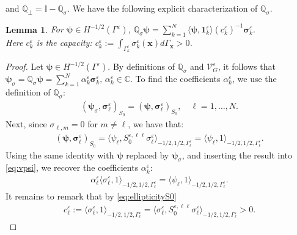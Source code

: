 \documentclass[]{article}
\newtheorem{lemma}{Lemma}
\numberwithin{equation}{section}
\numberwithin{theorem}{section}
\numberwithin{lemma}{section}
\numberwithin{corollary}{section}
\numberwithin{proposition}{section}
\numberwithin{definition}{section}
\newcommand{\re}{\varepsilon}
\renewcommand{\vec}{\boldsymbol}
\begin{document}
	and $\mathbb{Q}_{\perp}=\mathbb{I}-\mathbb{Q}_{\sigma}$. We have the following explicit characterization of $\mathbb{Q}_{\sigma}$. 
	\begin{lemma}
		\label{lem:expl_char}
		For $\vec{\psi}\in H^{-1/2}(\Gamma^{\re})$, $
		\mathbb{Q}_{\sigma}\vec{\psi}=\sum\limits_{k=1}^N \langle \vec{\psi},\vec{1}_k^{\re}\rangle \left(c_{k}^{\re}\right)^{-1} \vec{\sigma}_k^{\re}.$\\ Here $c^{\re}_k$ is the capacity: $c^{\re}_k:=\int_{\Gamma_k^{\re}}\sigma_{k}^{\re}(\vec{x})d\Gamma_{\vec{x}}>0$.
	\end{lemma}
	\begin{proof}
		Let $\vec{\psi}\in H^{-1/2}(\Gamma^{\re})$. By definitions of $\mathbb{Q}_{\sigma}$ and $\mathcal{V}^{\re}_G$, it follows that $
		\vec{\psi}_{\sigma}=\mathbb{Q}_{\sigma}\vec{\psi}=\sum\limits_{k=1}^N \alpha_k^{\re}\vec{\sigma}_k^{\re}, \, \alpha^{\re}_k\in \mathbb{C}$.  
		To find the coefficients $\alpha_k^{\re}$, we use the definition of $\mathbb{Q}_{\sigma}$: 
		\begin{align}
			\label{eq:vpsi}
			(\vec{\psi}_{\sigma}, \vec{\sigma}_{\ell}^{\re})_{S_0}=	(\vec{\psi}, \vec{\sigma}_{\ell}^{\re})_{S_0}, \quad \ell=1, \ldots, N. 
		\end{align}
		Next, since $\sigma_{\ell,m}=0$ for $m\neq \ell$, we have that:
		\begin{align*}%
			(\vec{\psi}, \vec{\sigma}_{\ell}^{\re})_{S_0}=\langle \psi_{\ell}, S_0^{\re,\ell\ell}\sigma^{\re}_{\ell}\rangle_{-1/2,1/2,\Gamma^{\re}_{\ell}}=\langle \psi_{\ell},1\rangle_{-1/2,1/2, \Gamma_{\ell}^{\re}}.
		\end{align*}
		Using the same identity with $\vec{\psi}$ replaced by $\vec{\psi}_{\sigma}$, and inserting the result into \eqref{eq:vpsi}, we recover the coefficients $\alpha_k^{\re}$:
		\begin{align*}%
			\alpha_{\ell}^{\re}\langle \sigma_{\ell}^{\re},1\rangle_{-1/2,1/2, \Gamma_{\ell}^{\re}}=\langle \psi_{\ell},1\rangle_{-1/2,1/2, \Gamma_{\ell}^{\re}}.
		\end{align*}
		It remains to remark that	by \eqref{eq:ellipticityS0}
		\begin{align}
			\label{eq:remark_cap_positive}
			c_{\ell}^{\re}:=\langle \sigma_{\ell}^{\re},1\rangle_{-1/2,1/2, \Gamma_{\ell}^{\re}}= \langle \sigma_{\ell}^{\re},S_0^{\re,\ell\ell}\sigma_{\ell}^{\re}\rangle_{-1/2,1/2, \Gamma_{\ell}^{\re}}>0. 
		\end{align}
	\end{proof}
\end{document}
